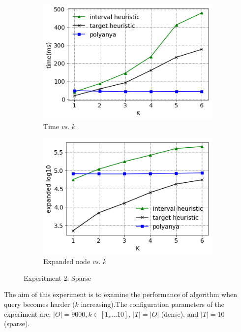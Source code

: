 \begin{figure}[!htbp]
    \centering
    
    \begin{subfigure}[b]{0.5\textwidth}
        \centering
        \includegraphics[width=.7\textwidth]{pic/e2_sparse_time.png}
        \caption{\small Time \textit{vs.} $k$}
        \label{e2_sparse_time}
    \end{subfigure}%
    \hfill
    \begin{subfigure}[b]{0.5\textwidth}
        \centering
        \includegraphics[width=.7\textwidth]{pic/e2_sparse_gen.png}
        \caption{\small Expanded node \textit{vs.} $k$}
        \label{e2_sparse_gen}
    \end{subfigure}
    \caption{\small Experitment 2: Sparse}
    
\end{figure}

The aim of this experiment is to examine the performance of algorithm when query becomes harder ($k$ increasing).The configuration parameters of the experiment are: $|O|=9000,k \in [1,...10]$, $|T|=|O|$ (dense), and $|T|=10$ (sparse).


